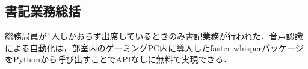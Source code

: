 \subsection*{書記業務総括}

総務局員が1人しかおらず出席しているときのみ書記業務が行われた．音声認識による自動化は，部室内のゲーミングPC内に導入したfaster-whisperパッケージをPythonから呼び出すことでAPIなしに無料で実現できる．

